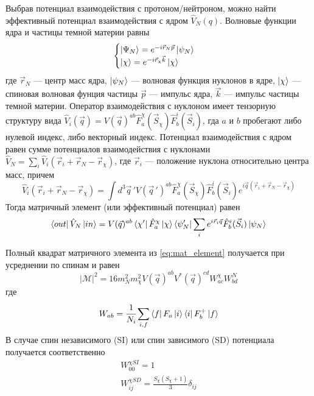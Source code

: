Выбрав потенциал взаимодействия с протоном/нейтроном, можно найти эффективный потенциал взаимодействия с ядром $\hat{V}_{N}(q)$. Волновые функции ядра и частицы темной материи равны
\begin{equation}
	\begin{cases}
		\ket{\Psi_N} = e^{-i\vec{r}_N \vec{p}} \ket{\psi_N} \\
		\ket{\chi} = e^{-i\vec{r}_{\chi} \vec{k}} \ket{\chi} \\
	\end{cases}
\end{equation}
где $\vec{r}_N$ --- центр масс ядра, $\ket{\psi_N}$ --- волновая функция нуклонов в ядре, $\ket{\chi}$ --- спиновая волновая фунция частицы $\vec{p}$ --- импульс ядра, $\vec{k}$ --- импульс частицы  темной материи. Оператор взаимодействия с нуклоном имеет тензорную структуру вида $\hat{V}_{i}(\vec{q}) = V(\vec{q})^{ab} \hat{F}^{\chi}_a(\vec{S}_{\chi})\hat{F}^{i}_b(\vec{S}_{i})$, гда $a$ и $b$ пробегают либо нулевой индекс, либо векторный индекс. Потенциал взаимодействия с ядром равен сумме потенциалов взаимодействия с нуклонами $\hat{V}_{N} = \sum_i{\hat{V}_{i}(\vec{r}_i + \vec{r}_N - \vec{r}_{\chi})}$, где $\vec{r}_i$ --- положение нуклона относительно центра масс, причем 
\begin{equation}
	\hat{V}_{i}(\vec{r}_i + \vec{r}_N - \vec{r}_{\chi}) = 
	\int{d^3\vec{q}\,' V(\vec{q}\,')^{ab} \hat{F}^{\chi}_a(\vec{S}_{\chi})\hat{F}^{i}_b(\vec{S}_{i})} e^{i\vec{q}(\vec{r}_i + \vec{r}_N - \vec{r}_{\chi})}
\end{equation}
Тогда матричный элемент (или эффективный потенциал) равен 
\begin{equation}
\begin{split}
	\bra{out}\hat{V}_{N}\ket{in} = V(\vec{q})^{ab} \bra{\chi'}\hat{F}^{\chi}_a\ket{\chi} 
	\bra{\psi_N'} \sum_i{e^{i\vec{r}_i\vec{q}}} \hat{F}^{i}_b(\vec{S}_{i})\ket{\psi_N}
\end{split}
\end{equation}

Полный квадрат матричного элемента из \ref{eq:mat_element} получается при усреднении по спинам и равен
\begin{equation}
	|\mathcal{M}|^2 = 16 m_N^2 m_{\chi}^2 V(\vec{q})^{ab} V^*(\vec{q})^{cd} W^{\chi}_{ac} W^{N}_{bd}
\end{equation}
где
\begin{equation}
	W_{ab} = \cfrac{1}{N_i}\sum_{i,f}{\bra{f}F_a\ket{i}\bra{i}F^+_b\ket{f}} 
\end{equation}
В случае спин независимого (SI) или спин зависимого (SD) потенциала получается соответственно
\begin{equation}
	\begin{split}
		W^{\chi SI}_{00} = 1 \\ 
		W^{\chi SD}_{ij} = \frac{S_{\chi}(S_{\chi}+1)}{3} \delta_{ij} \\
	\end{split}
\end{equation}

